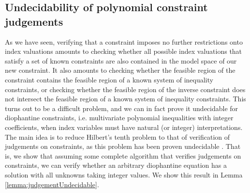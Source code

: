 \subsection{Undecidability of polynomial constraint judgements}
As we have seen, verifying that a constraint imposes no further restrictions onto index valuations amounts to checking whether all possible index valuations that satisfy a set of known constraints are also contained in the model space of our new constraint. It also amounts to checking whether the feasible region of the constraint contains the feasible region of a known system of inequality constraints, or checking whether the feasible region of the inverse constraint does not intersect the feasible region of a known system of inequality constraints. This turns out to be a difficult problem, and we can in fact prove it undecidable for diophantine constraints, i.e. multivariate polynomial inequalities with integer coefficients, when index variables must have natural (or integer) interpretations. The main idea is to reduce Hilbert's tenth problem \cite{Hilbert1902} to that of verification of judgements on constraints, as this problem has been proven undecidable \cite{Davis1973}. That is, we show that assuming some complete algorithm that verifies judgements on constraints, we can verify whether an arbitrary diophantine equation has a solution with all unknowns taking integer values. We show this result in Lemma \ref{lemma:judgementUndecidable}.
%
